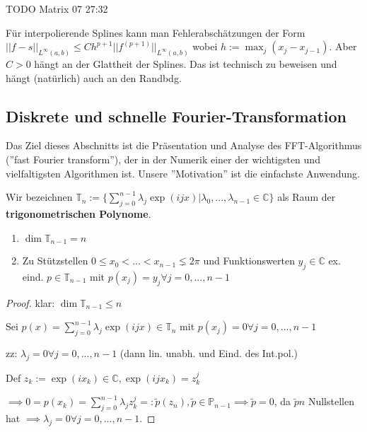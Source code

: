 TODO Matrix 07 27:32

\begin{remark}
	Für interpolierende Splines kann man Fehlerabschätzungen der Form $||f-s||_{L^\infty(a,b)} \leq C h^{p+1} ||f^{(p+1)}||_{L^\infty(a,b)}$ wobei $h := \max_j (x_j - x_{j-1})$. Aber $C > 0$ hängt an der Glattheit der Splines. Das ist technisch zu beweisen und hängt (natürlich) auch an den Randbdg.
\end{remark}

\subsection{Diskrete und schnelle Fourier-Transformation}

Das Ziel dieses Abschnitts ist die Präsentation und Analyse des FFT-Algorithmus (''fast Fourier transform''), der in der Numerik einer der wichtigsten und vielfaltigsten Algorithmen ist. Unsere ''Motivation'' ist die einfachste Anwendung.

\begin{definition}
	Wir bezeichnen $\mathbb{T}_n := \{ \sum_{j=0}^{n-1} \lambda_j \exp(ijx) | \lambda_0, ..., \lambda_{n-1} \in \mathbb{C}\}$ als Raum der \textbf{trigonometrischen Polynome}.
\end{definition}

\begin{theorem}
	\begin{enumerate}
		\item $\dim \mathbb{T}_{n-1} = n$
		
		\item Zu Stützstellen $0 \leq x_0 < ... < x_{n-1} \lneq 2\pi$ und Funktionswerten $y_j \in \mathbb{C}$ ex. eind. $p \in \mathbb{T}_{n-1}$ mit $p(x_j) = y_j \forall j=0, ..., n-1$
	\end{enumerate}
\end{theorem}

\begin{proof}
	klar: $\dim \mathbb{T}_{n-1} \leq n$
	
	Sei $p(x) = \sum_{j=0}^{n-1} \lambda_j \exp(ijx) \in \mathbb{T}_n$ mit $p(x_j) = 0 \forall j=0, ..., n-1$
	
	zz: $\lambda_j = 0 \forall j=0, ..., n-1$ (dann lin. unabh. und Eind. des Int.pol.)
	
	Def $z_k := \exp(ix_k) \in \mathbb{C}, \exp(ijx_k) = z_k^j$ 
	
	$\implies 0 = p(x_k) = \sum_{j=0}^{n-1} \lambda_j z_k^j =: \tilde{p}(z_n), \tilde{p} \in \mathbb{P}_{n-1} \implies \tilde{p} = 0$, da $\tilde{p} n$ Nullstellen hat $\implies \lambda_j = 0 \forall j=0, ..., n-1$.
\end{proof}


